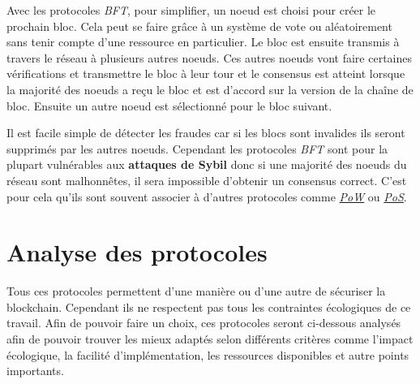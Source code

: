 Avec les protocoles \textit{BFT}, pour simplifier, un noeud est choisi pour créer le prochain bloc. Cela peut se faire grâce à un système de vote ou aléatoirement sans tenir compte d'une ressource en particulier. Le bloc est ensuite transmis à travers le réseau à plusieurs autres noeuds. Ces autres noeuds vont faire certaines vérifications et transmettre le bloc à leur tour et le consensus est atteint lorsque la majorité des noeuds a reçu le bloc et est d'accord sur la version de la chaîne de bloc. Ensuite un autre noeud est sélectionné pour le bloc suivant.

Il est facile simple de détecter les fraudes car si les blocs sont invalides ils seront supprimés par les autres noeuds. Cependant les protocoles \textit{BFT} sont pour la plupart vulnérables aux \textbf{attaques de Sybil} donc si une majorité des noeuds du réseau sont malhonnêtes, il sera impossible d'obtenir un consensus correct. C'est pour cela qu'ils sont souvent associer à d'autres protocoles comme \hyperref[consensus:pow]{\textit{PoW}} ou \hyperref[consensus:pos]{\textit{PoS}}.

\section{Analyse des protocoles}

Tous ces protocoles permettent d'une manière ou d'une autre de sécuriser la blockchain. Cependant ils ne respectent pas tous les contraintes écologiques de ce travail. Afin de pouvoir faire un choix, ces protocoles seront ci-dessous analysés afin de pouvoir trouver les mieux adaptés selon différents critères comme l'impact écologique, la facilité d'implémentation, les ressources disponibles et autre points importants.

